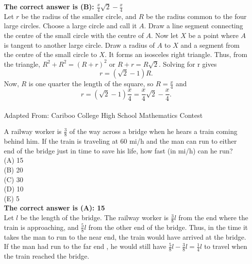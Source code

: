 \documentclass{article}
\begin{document}
\textbf{The correct answer is (B): $\frac{x}{4}\sqrt{2}-\frac{x}{4}$}\\[1 ex]
Let $r$ be the radius of the smaller circle, and $R$ be the radius common to the four large circles. Choose a large circle and call it $A$. Draw a line segment connecting the centre of the small circle with the centre of $A$. Now let $X$ be a point where $A$ is tangent to another large circle. Draw a radius of $A$ to $X$ and a segment from the centre of the small circle to $X$. It forms an isosceles right triangle. Thus, from the triangle, $R^{2}+R^{2}=(R+r)^2$ or $R+r=R\sqrt{2}$.  Solving for r gives
\begin{equation*}
r=(\sqrt{2}-1)R.
\end{equation*}
Now, $R$ is one quarter the length of the square, so $R=\frac{x}{4}$ and 
\begin{equation*}
r=(\sqrt{2}-1)\frac{x}{4}=\frac{x}{4}\sqrt{2}-\frac{x}{4}.
\end{equation*}
\\[5 ex]

\scriptsize
Adapted From: Cariboo College High School Mathematics Contest

\normalsize
A railway worker is $\frac{3}{8}$ of the way across a bridge when he hears a train coming behind him.  If the train is traveling at 60 mi/h and the man can run to either end of the bridge just in time to save his life, how fast (in mi/h) can he run?\\
(A) 15\\
(B) 20\\
(C) 30\\
(D) 10\\
(E) 5\\


\textbf{The correct answer is (A): 15}\\[1 ex]
Let $l$ be the length of the bridge. The railway worker is $\frac{3}{8}l$ from the end where the train is approaching, and $\frac{5}{8}l$ from the other end of the bridge. Thus, in the time it takes the man to run to the near end, the train would have arrived at the bridge. If the man had run to the far end , he would still have $\frac{5}{8}l-\frac{3}{8}l=\frac{1}{4}l$ to travel when the train reached the bridge. 
\end{document}
